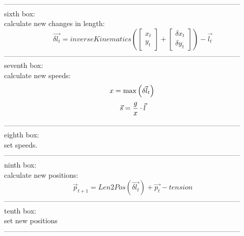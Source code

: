 \documentclass{article}
\begin{document}
---------------------------------------------------------------------------------------------------\\
sixth box:\\
calculate new changes in length:\\
	\[
	\vec{\delta{l_t}} = inverseKinematics \left(
	\begin{bmatrix}
	x_t\\
	y_t
	\end{bmatrix}
	+ 
	\begin{bmatrix}
	\delta{x_t}\\
	\delta{y_t}
	\end{bmatrix}
	\right)
	- \vec{l_t}
	\]
---------------------------------------------------------------------------------------------------\\
\newpage
seventh box:\\
calculate new speeds:\\
	
\[
x = \max\left(\vec{\delta{l_t}}\right)\\\\
\]\[
\vec{s} = \frac{g}{x}\cdot \vec{l}\\	
\]
---------------------------------------------------------------------------------------------------\\
eighth box:\\
set speeds.\\
---------------------------------------------------------------------------------------------------\\
ninth box:\\
calculate new positions:\\
\[
\vec{p}_{t+1} = Len2Pos \left(
\vec{\delta{l_t}}
\right)
+ \vec{p_t} - tension
\]
---------------------------------------------------------------------------------------------------\\
tenth box:\\
set new positions\\
---------------------------------------------------------------------------------------------------\\
\end{document}
